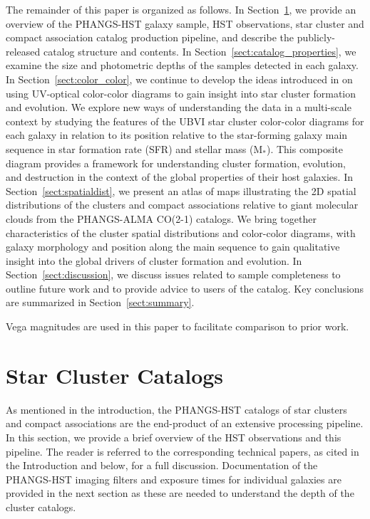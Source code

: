 \documentclass[linenumbers]{aastex63}
\begin{document}
The remainder of this paper is organized as follows. In Section~\ref{sect:catalog_content}, we provide an overview of the PHANGS-HST galaxy sample, HST observations, star cluster and compact association catalog production pipeline, and describe the publicly-released catalog structure and contents.  In Section~\ref{sect:catalog_properties}, we examine the size and photometric depths of the samples detected in each galaxy.  In Section~\ref{sect:color_color}, we continue to develop the ideas introduced in \cite{lee23ubvi} on using UV-optical color-color diagrams to gain insight into star cluster formation and evolution.  We explore new ways of understanding the data in a multi-scale context by studying the features of the UBVI star cluster color-color diagrams for each galaxy in relation to its position relative to the star-forming galaxy main sequence in star formation rate (SFR) and stellar mass (M$_*$).  This composite diagram provides a framework for understanding cluster formation, evolution, and destruction in the context of the global properties of their host galaxies.  In Section~\ref{sect:spatialdist}, we present an atlas of maps illustrating the 2D spatial distributions of the clusters and compact associations relative to giant molecular clouds from the PHANGS-ALMA CO(2-1) catalogs.  We bring together characteristics of the cluster spatial distributions and color-color diagrams, with galaxy morphology and position along the main sequence to gain qualitative insight into the global drivers of cluster formation and evolution.  In Section~\ref{sect:discussion}, we discuss issues related to sample completeness to outline future work and to provide advice to users of the catalog.  Key conclusions are summarized in Section~\ref{sect:summary}.

Vega magnitudes are used in this paper to facilitate comparison to prior work.

\section{Star Cluster Catalogs}\label{sect:catalog_content}
As mentioned in the introduction, the PHANGS-HST catalogs of star clusters and compact associations are the end-product of an extensive processing pipeline.  In this section, we provide a brief overview of the HST observations and this pipeline.  The reader is referred to the corresponding technical papers, as cited in the Introduction and below, for a full discussion.  Documentation of the PHANGS-HST imaging filters and exposure times for individual galaxies are provided in the next section as these are needed to understand the depth of the cluster catalogs.   
\end{document}
